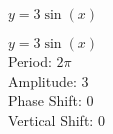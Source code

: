 {$y = 3\sin(x)$}
{$y = 3\sin(x)$\\
Period: $2\pi$\\
Amplitude: $3$\\
Phase Shift: $0$\\
Vertical Shift: $0$

\begin{center}
\end{center}}
